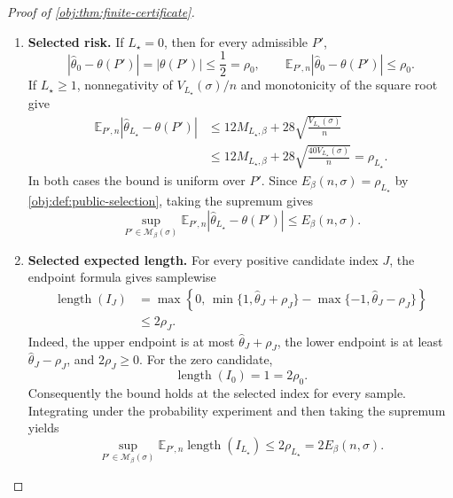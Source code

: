 \documentclass[11pt]{article}
\begin{document}
\begin{proof}[Proof of \cref{obj:thm:finite-certificate}]
\begin{enumerate}
\item \textbf{Selected risk.}
If \(L_\star=0\), then for every admissible \(P'\),
\[
|\widehat\theta_0-\theta(P')|
=|\theta(P')|\le\frac12=\rho_0,
\qquad
\mathbb E_{P',n}|\widehat\theta_0-\theta(P')|\le\rho_0.
\]
If \(L_\star\ge1\), nonnegativity of \(V_{L_\star}(\sigma)/n\) and monotonicity of the square root give
\[
\begin{aligned}
\mathbb E_{P',n}|\widehat\theta_{L_\star}-\theta(P')|
&\le12M_{L_\star,\beta}
+28\sqrt{\frac{V_{L_\star}(\sigma)}n}\\
&\le12M_{L_\star,\beta}
+28\sqrt{\frac{40V_{L_\star}(\sigma)}n}
=\rho_{L_\star}.
\end{aligned}
\]
In both cases the bound is uniform over \(P'\). Since
\(E_\beta(n,\sigma)=\rho_{L_\star}\) by
\cref{obj:def:public-selection}, taking the supremum gives
\[
\sup_{P'\in\mathcal M_\beta(\sigma)}
\mathbb E_{P',n}|\widehat\theta_{L_\star}-\theta(P')|
\le E_\beta(n,\sigma).
\]

\item \textbf{Selected expected length.}
For every positive candidate index \(J\), the endpoint formula gives samplewise
\[
\begin{aligned}
\operatorname{length}(I_J)
&=\max\!\left\{0,\,
\min\{1,\widehat\theta_J+\rho_J\}
-\max\{-1,\widehat\theta_J-\rho_J\}\right\}\\
&\le2\rho_J.
\end{aligned}
\]
Indeed, the upper endpoint is at most
\(\widehat\theta_J+\rho_J\), the lower endpoint is at least
\(\widehat\theta_J-\rho_J\), and \(2\rho_J\ge0\).
For the zero candidate,
\[
\operatorname{length}(I_0)=1=2\rho_0.
\]
Consequently the bound holds at the selected index for every sample. Integrating under the probability experiment and then taking the supremum yields
\[
\sup_{P'\in\mathcal M_\beta(\sigma)}
\mathbb E_{P',n}\operatorname{length}(I_{L_\star})
\le2\rho_{L_\star}
=2E_\beta(n,\sigma).
\]
\end{enumerate}
\end{proof}
\end{document}
